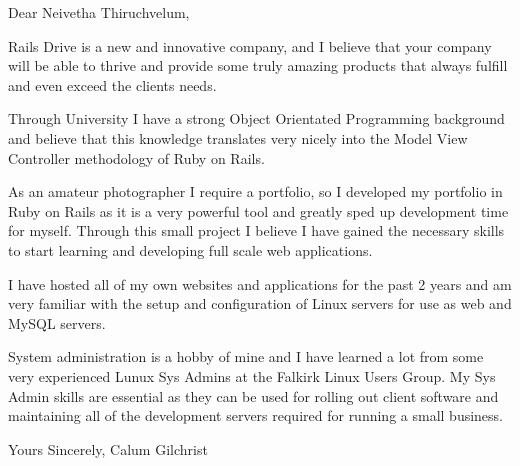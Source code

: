 
Dear Neivetha Thiruchvelum,


Rails Drive is a new and innovative company, and I believe that your company will be able
to thrive and provide some truly amazing products that always fulfill and even exceed
the clients needs.


Through University I have a strong Object Orientated Programming background and
believe that this knowledge translates very nicely into the Model View
Controller methodology of Ruby on Rails.


As an amateur photographer I require a portfolio, so I developed my portfolio in
Ruby on Rails as it is a very powerful tool and greatly sped up development time
for myself. Through this small project I believe I have gained the necessary
skills to start learning and developing full scale web applications.

I have hosted all of my own websites and applications for the past 2 years and
am very familiar with the setup and configuration of Linux servers for use as
web and MySQL servers.

System administration is a hobby of mine and I have learned a lot from some very
experienced Lunux Sys Admins at the Falkirk Linux Users Group. My Sys Admin
skills are essential as they can be used for rolling out client software and
maintaining all of the development servers required for running a small
business.

Yours Sincerely,
Calum Gilchrist

